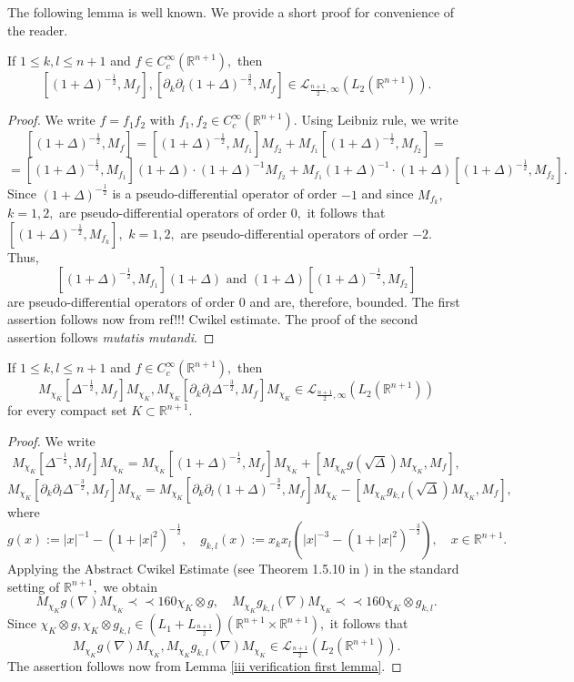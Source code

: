 \documentclass{amsart}
\begin{document}
The following lemma is well known. We provide a short proof for convenience of the reader.

\begin{lemma}\label{iii verification first lemma} If $1\leq k,l\leq n+1$ and $f\in C^{\infty}_c(\mathbb{R}^{n+1}),$ then
$$[(1+\Delta)^{-\frac12},M_f],[\partial_k\partial_l(1+\Delta)^{-\frac32},M_f]\in \mathcal{L}_{\frac{n+1}{2},\infty}(L_2(\mathbb{R}^{n+1})).$$
\end{lemma}
\begin{proof} We write $f=f_1f_2$ with $f_1,f_2\in C^{\infty}_c(\mathbb{R}^{n+1}).$ Using Leibniz rule, we write
$$[(1+\Delta)^{-\frac12},M_f]=[(1+\Delta)^{-\frac12},M_{f_1}]M_{f_2}+M_{f_1}[(1+\Delta)^{-\frac12},M_{f_2}]=$$
$$=[(1+\Delta)^{-\frac12},M_{f_1}](1+\Delta)\cdot (1+\Delta)^{-1}M_{f_2}+M_{f_1}(1+\Delta)^{-1}\cdot (1+\Delta)[(1+\Delta)^{-\frac12},M_{f_2}].$$
Since $(1+\Delta)^{-\frac12}$ is a pseudo-differential operator of order $-1$ and since $M_{f_k},$ $k=1,2,$ are pseudo-differential operators of order $0,$ it follows that $[(1+\Delta)^{-\frac12},M_{f_k}],$ $k=1,2,$ are pseudo-differential operators of order $-2.$ Thus,
$$[(1+\Delta)^{-\frac12},M_{f_1}](1+\Delta)\mbox{ and }(1+\Delta)[(1+\Delta)^{-\frac12},M_{f_2}]$$
are pseudo-differential operators of order $0$ and are, therefore, bounded. The first assertion follows now from {\color{red} ref!!!} Cwikel estimate. The proof of the second assertion follows {\it mutatis mutandi}.
\end{proof}

\begin{lemma}\label{iii verification second lemma} If $1\leq k,l\leq n+1$ and $f\in C^{\infty}_c(\mathbb{R}^{n+1}),$ then
$$M_{\chi_K}[\Delta^{-\frac12},M_f]M_{\chi_K},M_{\chi_K}[\partial_k\partial_l\Delta^{-\frac32},M_f]M_{\chi_K}\in \mathcal{L}_{\frac{n+1}{2},\infty}(L_2(\mathbb{R}^{n+1}))$$
for every compact set $K\subset\mathbb{R}^{n+1}.$
\end{lemma}
\begin{proof} We write
$$M_{\chi_K}[\Delta^{-\frac12},M_f]M_{\chi_K}=M_{\chi_K}[(1+\Delta)^{-\frac12},M_f]M_{\chi_K}+[M_{\chi_K}g(\sqrt{\Delta})M_{\chi_K},M_f],$$
$$M_{\chi_K}[\partial_k\partial_l\Delta^{-\frac32},M_f]M_{\chi_K}=M_{\chi_K}[\partial_k\partial_l(1+\Delta)^{-\frac32},M_f]M_{\chi_K}-[M_{\chi_K}g_{k,l}(\sqrt{\Delta})M_{\chi_K},M_f],$$		
where
$$g(x):=|x|^{-1}-(1+|x|^2)^{-\frac12},\quad g_{k,l}(x):=x_kx_l(|x|^{-3}-(1+|x|^2)^{-\frac32}),\quad x\in\mathbb{R}^{n+1}.$$
Applying the Abstract Cwikel Estimate (see Theorem 1.5.10 in \cite{LSZ2}) in the standard setting of $\mathbb{R}^{n+1},$ we obtain
$$M_{\chi_K}g(\nabla)M_{\chi_K}\prec\prec 160\chi_K\otimes g,\quad M_{\chi_K}g_{k,l}(\nabla)M_{\chi_K}\prec\prec 160\chi_K\otimes g_{k,l}.$$
Since $\chi_K\otimes g,\chi_K\otimes g_{k,l}\in (L_1+L_{\frac{n+1}{2}})(\mathbb{R}^{n+1}\times\mathbb{R}^{n+1}),$ it follows that
$$M_{\chi_K}g(\nabla)M_{\chi_K},M_{\chi_K}g_{k,l}(\nabla)M_{\chi_K}\in\mathcal{L}_{\frac{n+1}{2}}(L_2(\mathbb{R}^{n+1})).$$
The assertion follows now from Lemma \ref{iii verification first lemma}.
\end{proof}
\end{document}

